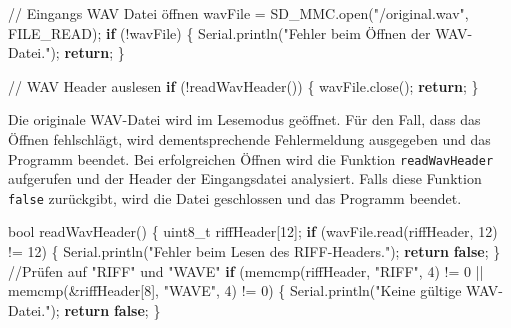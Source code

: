 \documentclass[
  ngerman,
  letterpaper,
  DIV=11]{scrreprt}
\newenvironment{Shaded}{\begin{snugshade}}{\end{snugshade}}
\newcommand{\CommentTok}[1]{\textcolor[rgb]{0.37,0.37,0.37}{#1}}
\newcommand{\ControlFlowTok}[1]{\textcolor[rgb]{0.00,0.23,0.31}{\textbf{#1}}}
\newcommand{\DataTypeTok}[1]{\textcolor[rgb]{0.68,0.00,0.00}{#1}}
\newcommand{\DecValTok}[1]{\textcolor[rgb]{0.68,0.00,0.00}{#1}}
\newcommand{\KeywordTok}[1]{\textcolor[rgb]{0.00,0.23,0.31}{\textbf{#1}}}
\newcommand{\NormalTok}[1]{\textcolor[rgb]{0.00,0.23,0.31}{#1}}
\newcommand{\OperatorTok}[1]{\textcolor[rgb]{0.37,0.37,0.37}{#1}}
\newcommand{\StringTok}[1]{\textcolor[rgb]{0.13,0.47,0.30}{#1}}
\begin{document}
\begin{Shaded}
\begin{Highlighting}[]
\CommentTok{// Eingangs WAV Datei öffnen}
\NormalTok{wavFile }\OperatorTok{=}\NormalTok{ SD\_MMC}\OperatorTok{.}\NormalTok{open}\OperatorTok{(}\StringTok{"/original.wav"}\OperatorTok{,}\NormalTok{ FILE\_READ}\OperatorTok{);}
\ControlFlowTok{if} \OperatorTok{(!}\NormalTok{wavFile}\OperatorTok{)} \OperatorTok{\{}
\NormalTok{  Serial}\OperatorTok{.}\NormalTok{println}\OperatorTok{(}\StringTok{"Fehler beim Öffnen der WAV{-}Datei."}\OperatorTok{);}
  \ControlFlowTok{return}\OperatorTok{;}
\OperatorTok{\}}

\CommentTok{// WAV Header auslesen}
\ControlFlowTok{if} \OperatorTok{(!}\NormalTok{readWavHeader}\OperatorTok{())} \OperatorTok{\{}
\NormalTok{  wavFile}\OperatorTok{.}\NormalTok{close}\OperatorTok{();}
  \ControlFlowTok{return}\OperatorTok{;}
\OperatorTok{\}}
\end{Highlighting}
\end{Shaded}

Die originale WAV-Datei wird im Lesemodus geöffnet. Für den Fall, dass
das Öffnen fehlschlägt, wird dementsprechende Fehlermeldung ausgegeben
und das Programm beendet. Bei erfolgreichen Öffnen wird die Funktion
\texttt{readWavHeader} aufgerufen und der Header der Eingangsdatei
analysiert. Falls diese Funktion \texttt{false} zurückgibt, wird die
Datei geschlossen und das Programm beendet.

\begin{Shaded}
\begin{Highlighting}[]
\DataTypeTok{bool}\NormalTok{ readWavHeader}\OperatorTok{()} \OperatorTok{\{}
  \DataTypeTok{uint8\_t}\NormalTok{ riffHeader}\OperatorTok{[}\DecValTok{12}\OperatorTok{];}
  \ControlFlowTok{if} \OperatorTok{(}\NormalTok{wavFile}\OperatorTok{.}\NormalTok{read}\OperatorTok{(}\NormalTok{riffHeader}\OperatorTok{,} \DecValTok{12}\OperatorTok{)} \OperatorTok{!=} \DecValTok{12}\OperatorTok{)} \OperatorTok{\{}
\NormalTok{    Serial}\OperatorTok{.}\NormalTok{println}\OperatorTok{(}\StringTok{"Fehler beim Lesen des RIFF{-}Headers."}\OperatorTok{);}
    \ControlFlowTok{return} \KeywordTok{false}\OperatorTok{;}
  \OperatorTok{\}}
  \CommentTok{//Prüfen auf "RIFF" und "WAVE"}
  \ControlFlowTok{if} \OperatorTok{(}\NormalTok{memcmp}\OperatorTok{(}\NormalTok{riffHeader}\OperatorTok{,} \StringTok{"RIFF"}\OperatorTok{,} \DecValTok{4}\OperatorTok{)} \OperatorTok{!=} \DecValTok{0} \OperatorTok{||}\NormalTok{ memcmp}\OperatorTok{(\&}\NormalTok{riffHeader}\OperatorTok{[}\DecValTok{8}\OperatorTok{],}
   \StringTok{"WAVE"}\OperatorTok{,} \DecValTok{4}\OperatorTok{)} \OperatorTok{!=} \DecValTok{0}\OperatorTok{)} \OperatorTok{\{}
\NormalTok{    Serial}\OperatorTok{.}\NormalTok{println}\OperatorTok{(}\StringTok{"Keine gültige WAV{-}Datei."}\OperatorTok{);}
    \ControlFlowTok{return} \KeywordTok{false}\OperatorTok{;}
  \OperatorTok{\}}
\end{Highlighting}
\end{Shaded}
\end{document}
